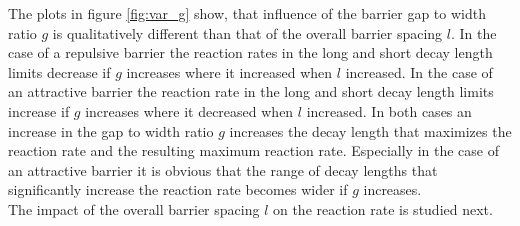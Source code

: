 The plots in figure \ref{fig:var_g} show, that influence of the barrier gap to width ratio $g$ is qualitatively different than that of the overall barrier spacing $l$. In the case of a repulsive barrier the reaction rates in the long and short decay length limits decrease if $g$ increases where it increased when $l$ increased. In the case of an attractive barrier the reaction rate in the long and short decay length limits increase if $g$ increases where it decreased when $l$ increased.
In both cases an increase in the gap to width ratio $g$ increases the decay length that maximizes the reaction rate and the resulting maximum reaction rate. Especially in the case of an attractive barrier it is obvious that the range of decay lengths that significantly increase the reaction rate becomes wider if $g$ increases. \\

The impact of the overall barrier spacing $l$ on the reaction rate is studied next.

